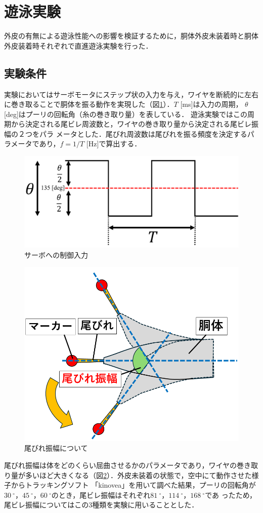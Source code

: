 \newpage
\section{遊泳実験}
外皮の有無による遊泳性能への影響を検証するために，胴体外皮未装着時と胴体外皮装着時それぞれで直進遊泳実験を行った．

\subsection{実験条件}
実験においてはサーボモータにステップ状の入力を与え，ワイヤを断続的に左右に巻き取ることで胴体を振る動作を実現した（図\ref{fig:servo_seigyo}）．$T$ [ms]は入力の周期，
$\theta$ [deg]はプーリの回転角（糸の巻き取り量）を表している．
遊泳実験ではこの周期から決定される尾ビレ周波数と，ワイヤの巻き取り量から決定される尾ビレ振幅の２つをパラ
メータとした．尾びれ周波数は尾びれを振る頻度を決定するパラメータであり，$f = 1/T$ [Hz]で算出する．
\begin{figure}[hb]
    \centering
    \includegraphics[width=0.8\linewidth]{chapters/picture/servo.png}
    \caption{サーボへの制御入力}
    \label{fig:servo_seigyo}
\end{figure}
\begin{figure}[hb]
    \centering
    \includegraphics[width=0.6\linewidth]{chapters/picture/obire_amp.png}
    \caption{尾びれ振幅について}
    \label{fig:obire_amp}
\end{figure}
尾びれ振幅は体をどのくらい屈曲させるかのパラメータであり，ワイヤの巻き取り量が多いほど大きくなる（図\ref{fig:obire_amp}）．外皮未装着の状態で，空中にて動作させた様子からトラッキングソフト
「kinovea」を用いて調べた結果，プーリの回転角が$30\:^\circ$，$45\:^\circ$，$60\:^\circ$のとき，尾ビレ振幅はそれぞれ$81\:^\circ$，$114\:^\circ$，$168\:^\circ$であ
ったため，尾ビレ振幅についてはこの3種類を実験に用いることとした． 

